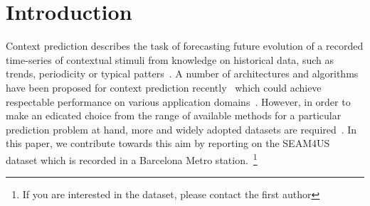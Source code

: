 \section{Introduction}
\label{sec:introduction}
Context prediction describes the task of forecasting future evolution of a recorded time-series of contextual stimuli from knowledge on historical data, such as trends, periodicity or typical patters~\cite{4011,5001}.
A number of architectures and algorithms have been proposed for context prediction recently~\cite{4027,2097,Prediction_Eldaw_2013} which could achieve respectable performance on various application domains~\cite{4026,Prediction_Zhang_2013}.
However, in order to make an edicated choice from the range of available methods for a particular prediction problem at hand, more and widely adopted datasets are required~\cite{Prediction_Zhang_2012}.
In this paper, we contribute towards this aim by reporting on the SEAM4US dataset which is recorded in a Barcelona Metro station.~\footnote{If you are interested in the dataset, please contact the first author}

